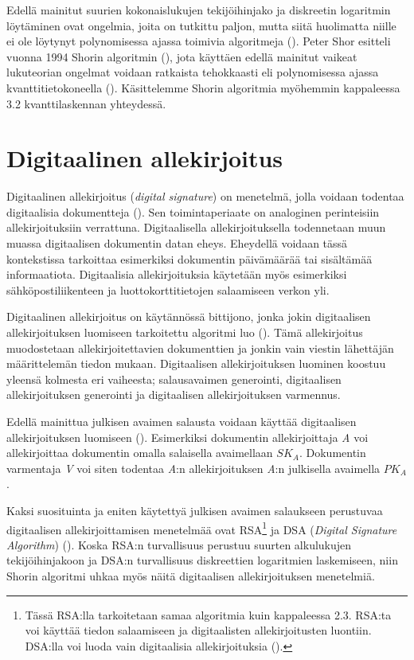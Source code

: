  Edellä mainitut suurien kokonaislukujen tekijöihinjako ja diskreetin logaritmin löytäminen ovat ongelmia, joita on tutkittu paljon, mutta siitä huolimatta niille ei ole löytynyt polynomisessa ajassa toimivia algoritmeja (\cite{doi:10.1137/S0036144598347011}). Peter Shor esitteli vuonna 1994 Shorin algoritmin (\cite{mavroeidis2018impact}), jota käyttäen edellä mainitut vaikeat lukuteorian ongelmat voidaan ratkaista tehokkaasti eli polynomisessa ajassa kvanttitietokoneella (\cite{doi:10.1137/S0036144598347011}). Käsittelemme Shorin algoritmia myöhemmin kappaleessa 3.2 kvanttilaskennan yhteydessä.
 
 \section{Digitaalinen allekirjoitus}
 Digitaalinen allekirjoitus (\emph{digital signature}) on menetelmä, jolla voidaan todentaa digitaalisia dokumentteja (\cite{1649003}). Sen toimintaperiaate on analoginen perinteisiin allekirjoituksiin verrattuna. Digitaalisella allekirjoituksella todennetaan muun muassa digitaalisen dokumentin datan eheys. Eheydellä voidaan tässä kontekstissa tarkoittaa esimerkiksi dokumentin päivämäärää tai sisältämää informaatiota. Digitaalisia allekirjoituksia käytetään myös esimerkiksi sähköpostiliikenteen ja luottokorttitietojen salaamiseen verkon yli.
 
 Digitaalinen allekirjoitus on käytännössä bittijono, jonka jokin digitaalisen allekirjoituksen luomiseen tarkoitettu algoritmi luo (\cite{1649003}). Tämä allekirjoitus muodostetaan allekirjoitettavien dokumenttien ja jonkin vain viestin lähettäjän määrittelemän tiedon mukaan. Digitaalisen allekirjoituksen luominen koostuu yleensä kolmesta eri vaiheesta; salausavaimen generointi, digitaalisen allekirjoituksen generointi ja digitaalisen allekirjoituksen varmennus.
 
 Edellä mainittua julkisen avaimen salausta voidaan käyttää digitaalisen allekirjoituksen luomiseen (\cite{mavroeidis2018impact}). Esimerkiksi dokumentin allekirjoittaja \emph{A} voi allekirjoittaa dokumentin omalla salaisella avaimellaan $SK_{A}$. Dokumentin varmentaja \emph{V} voi siten todentaa \emph{A}:n allekirjoituksen \emph{A}:n julkisella avaimella $PK_{A}$.
 
 Kaksi suosituinta ja eniten käytettyä julkisen avaimen salaukseen perustuvaa digitaalisen allekirjoittamisen menetelmää ovat RSA\footnote{Tässä RSA:lla tarkoitetaan samaa algoritmia kuin kappaleessa 2.3. RSA:ta voi käyttää tiedon salaamiseen ja digitaalisten allekirjoitusten luontiin. DSA:lla voi luoda vain digitaalisia allekirjoituksia (\cite{4659731}).} ja DSA (\emph{Digital Signature Algorithm}) (\cite{1649003}). Koska RSA:n turvallisuus perustuu suurten alkulukujen tekijöihinjakoon ja DSA:n turvallisuus diskreettien logaritmien laskemiseen, niin Shorin algoritmi uhkaa myös näitä digitaalisen allekirjoituksen menetelmiä.
